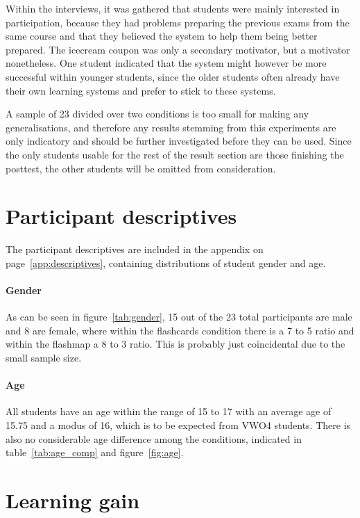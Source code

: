 Within the interviews, it was gathered that students were mainly interested in participation, because they had problems preparing the previous exams from the same course and that they believed the system to help them being better prepared. The icecream coupon was only a secondary motivator, but a motivator nonetheless. One student indicated that the system might however be more successful within younger students, since the older students often already have their own learning systems and prefer to stick to these systems.

A sample of 23 divided over two conditions is too small for making any generalisations, and therefore any results stemming from this experiments are only indicatory and should be further investigated before they can be used. Since the only students usable for the rest of the result section are those finishing the posttest, the other students will be omitted from consideration.

\section{Participant descriptives}

The participant descriptives are included in the  appendix on page~\ref{app:descriptives}, containing distributions of student gender and age.

\paragraph{Gender} As can be seen in figure~\ref{tab:gender}, 15 out of the 23 total participants are male and 8 are female, where within the flashcards condition there is a 7 to 5 ratio and within the flashmap a 8 to 3 ratio. This is probably just coincidental due to the small sample size.

\paragraph{Age} All students have an age within the range of 15 to 17 with an average age of 15.75 and a modus of 16, which is to be expected from VWO4 students. There is also no considerable age difference among the conditions, indicated in table~\ref{tab:age_comp} and figure~\ref{fig:age}.

\section{Learning gain}

